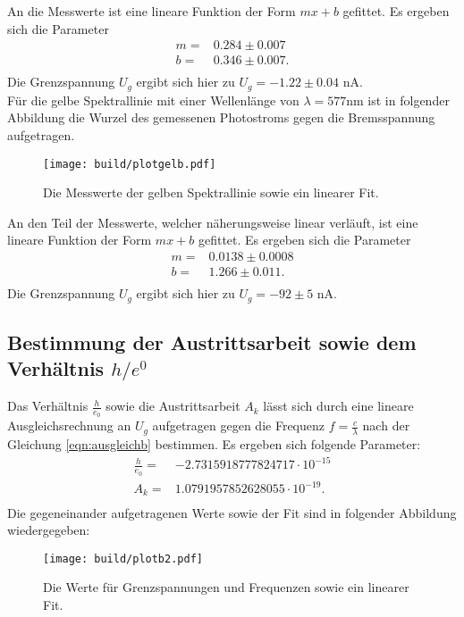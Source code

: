 An die Messwerte ist eine lineare Funktion der Form $mx +b$ gefittet. Es ergeben
sich die Parameter
\begin{align*}
  m = & 0.284 \pm 0.007 \\
  b = & 0.346 \pm 0.007.\\
\end{align*}
Die Grenzspannung $U_g$ ergibt sich hier zu $ U_g = -1.22 \pm 0.04$ \si{\nano\ampere}. \\
\noindent
Für die gelbe Spektrallinie mit einer Wellenlänge von $\lambda = 577 \si{\nano\meter}$
ist in folgender Abbildung die Wurzel des gemessenen Photostroms gegen die Bremsspannung
aufgetragen.
\begin{figure}[H]
  \centering
  \texttt{[image: build/plotgelb.pdf]}
  \label{fig:plotgelb}
  \caption{Die Messwerte der gelben Spektrallinie sowie ein linearer Fit.}
\end{figure}
\noindent
An den Teil der Messwerte, welcher näherungsweise linear verläuft, ist eine lineare Funktion der Form $mx +b$ gefittet. Es ergeben sich die Parameter
\begin{align*}
  m = & 0.0138 \pm 0.0008 \\
  b = & 1.266 \pm 0.011.\\
\end{align*}
Die Grenzspannung $U_g$ ergibt sich hier zu $ U_g = -92 \pm 5$ \si{\nano\ampere}. \\
\subsection{Bestimmung der Austrittsarbeit sowie dem Verhältnis $h/e^0$}
Das Verhältnis $\frac{h}{e_0}$ sowie die Austrittsarbeit $A_k$ lässt sich durch
eine lineare Ausgleichsrechnung an $U_g$ aufgetragen gegen die Frequenz $f = \frac{c}{\lambda}$
nach der Gleichung \eqref{eqn:ausgleichb} bestimmen.
Es ergeben sich folgende Parameter:
\begin{align}
  \frac{h}{e_0} = & -2.7315918777824717 \cdot 10^{-15} \\
  A_k           = & 1.0791957852628055 \cdot 10^{-19}.  \\
  \label{eqn:ergebnisseb}
\end{align}
Die gegeneinander aufgetragenen Werte sowie der Fit sind in folgender Abbildung wiedergegeben:
\begin{figure}[H]
  \centering
  \texttt{[image: build/plotb2.pdf]}
  \label{fig:plotb2}
  \caption{Die Werte für Grenzspannungen und Frequenzen sowie ein linearer Fit.}
\end{figure}
\noindent

